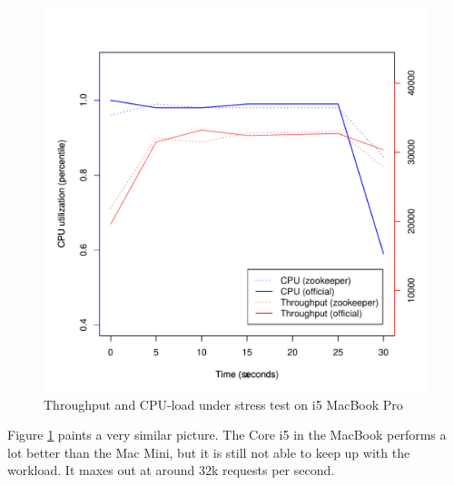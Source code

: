 \clearpage
\begin{figure}[h]
    \centering
    \includegraphics[width=1.0\textwidth]{results/throughput/singlenode/throughput_knut}
    \caption{Throughput and CPU-load under stress test on i5 MacBook Pro}
    \label{fig:thug_knut}
\end{figure}

Figure \ref{fig:thug_knut} paints a very similar picture. The Core i5 in the MacBook performs a lot better than the Mac Mini, but it is still not able to keep up with the workload. It maxes out at around 32k requests per second. 

\clearpage


